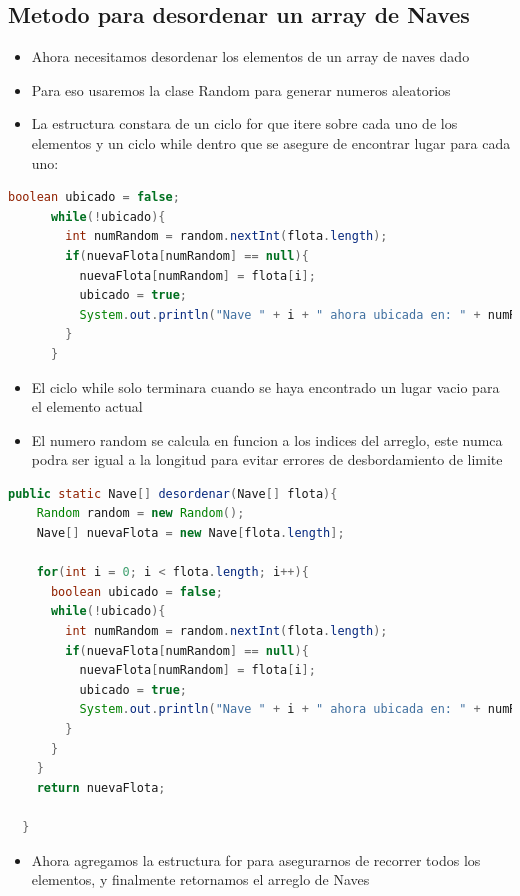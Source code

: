 \documentclass{article}
\begin{document}
        \subsection{Metodo para desordenar un array de Naves}
        \begin{itemize}
            \item Ahora necesitamos desordenar los elementos de un array de naves dado
            \item Para eso usaremos la clase Random para generar numeros aleatorios
            \item La estructura constara de un ciclo for que itere sobre cada uno de los elementos y un ciclo while dentro que se asegure de encontrar lugar para cada uno:
        \end{itemize}
        \begin{lstlisting}[language=java, caption={Ciclo while}]
      boolean ubicado = false;
      while(!ubicado){
        int numRandom = random.nextInt(flota.length);
        if(nuevaFlota[numRandom] == null){
          nuevaFlota[numRandom] = flota[i];
          ubicado = true;
          System.out.println("Nave " + i + " ahora ubicada en: " + numRandom);
        }
      }
        \end{lstlisting}
        \begin{itemize}
            \item El ciclo while solo terminara cuando se haya encontrado un lugar vacio para el elemento actual
            \item El numero random se calcula en funcion a los indices del arreglo, este numca podra ser igual a la longitud para evitar errores de desbordamiento de limite
        \end{itemize}
        \begin{lstlisting}[language=java, caption={Metodo completo}]
  public static Nave[] desordenar(Nave[] flota){
    Random random = new Random();
    Nave[] nuevaFlota = new Nave[flota.length];
    
    for(int i = 0; i < flota.length; i++){
      boolean ubicado = false;
      while(!ubicado){
        int numRandom = random.nextInt(flota.length);
        if(nuevaFlota[numRandom] == null){
          nuevaFlota[numRandom] = flota[i];
          ubicado = true;
          System.out.println("Nave " + i + " ahora ubicada en: " + numRandom);
        }
      }
    }
    return nuevaFlota;

  }
        \end{lstlisting}
        \begin{itemize}
            \item Ahora agregamos la estructura for para asegurarnos de recorrer todos los elementos, y finalmente retornamos el arreglo de Naves
        \end{itemize}
        
\end{document}
